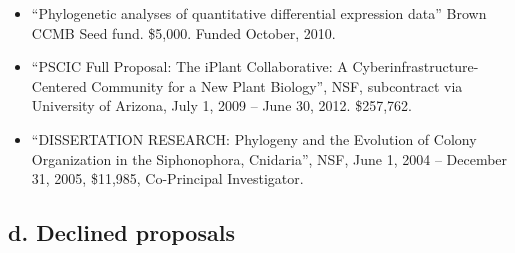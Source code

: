 \begin{itemize}
\item ``Phylogenetic analyses of quantitative differential expression data'' Brown CCMB Seed fund. \$5,000. Funded October, 2010.

\item ``PSCIC Full Proposal: The iPlant Collaborative: A Cyberinfrastructure-Centered Community for a New Plant Biology'', NSF, subcontract via University of Arizona, July 1, 2009 -- June 30, 2012. \$257,762.

\item ``DISSERTATION RESEARCH: Phylogeny and the Evolution of Colony Organization in the Siphonophora, Cnidaria'', NSF, June 1, 2004 -- December 31, 2005, \$11,985, Co-Principal Investigator.

\end{itemize}


\iffalse

\subsection*{d. Declined proposals}

